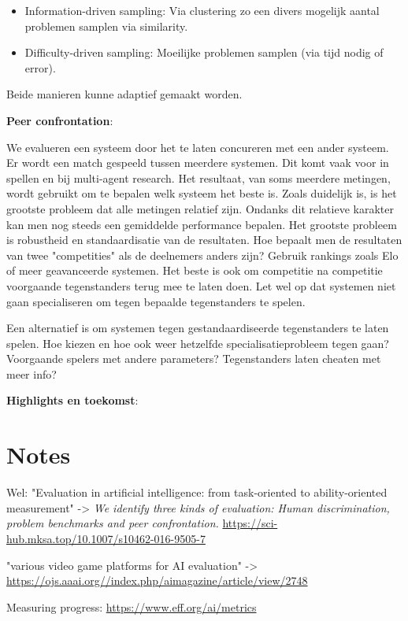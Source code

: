 \documentclass[11pt]{article}
\begin{document}
\begin{itemize}
\item Information-driven sampling: Via clustering zo een divers mogelijk aantal problemen samplen via similarity.
\item Difficulty-driven sampling: Moeilijke problemen samplen (via tijd nodig of error).
\end{itemize}

Beide manieren kunne adaptief gemaakt worden.

\textbf{Peer confrontation}:

We evalueren een systeem door het te laten concureren met een ander systeem. Er wordt een match gespeeld tussen meerdere systemen. Dit komt vaak voor in spellen en bij multi-agent research. Het resultaat, van soms meerdere metingen, wordt gebruikt om te bepalen welk systeem het beste is. Zoals duidelijk is, is het grootste probleem dat alle metingen relatief zijn. Ondanks dit relatieve karakter kan men nog steeds een gemiddelde performance bepalen. Het grootste probleem is robustheid en standaardisatie van de resultaten. Hoe bepaalt men de resultaten van twee "competities" als de deelnemers anders zijn? Gebruik rankings zoals Elo of meer geavanceerde systemen. Het beste is ook om competitie na competitie voorgaande tegenstanders terug mee te laten doen. Let wel op dat systemen niet gaan specialiseren om tegen bepaalde tegenstanders te spelen.

Een alternatief is om systemen tegen gestandaardiseerde tegenstanders te laten spelen. Hoe kiezen en hoe ook weer hetzelfde specialisatieprobleem tegen gaan? Voorgaande spelers met andere parameters? Tegenstanders laten cheaten met meer info?

\textbf{Highlights en toekomst}:


\section{Notes}
\label{sec:orgeb0781c}

Wel: "Evaluation in artificial intelligence: from task-oriented to ability-oriented measurement" -> \emph{We identify three kinds of evaluation: Human discrimination, problem benchmarks and peer confrontation.} \cite{orallo_2016}
\url{https://sci-hub.mksa.top/10.1007/s10462-016-9505-7}

"various video game platforms for AI evaluation" -> \url{https://ojs.aaai.org//index.php/aimagazine/article/view/2748}

Measuring progress: \url{https://www.eff.org/ai/metrics}

\printbibliography
\end{document}
